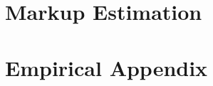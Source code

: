 


\section{Markup Estimation}\label{sec:app-muest}




\section{Empirical Appendix}\label{sec:app-emp}



